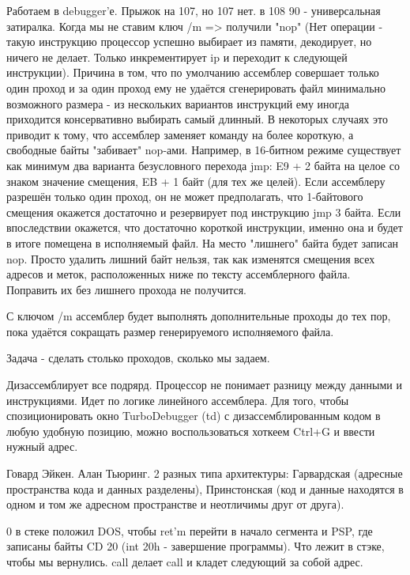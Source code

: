 Работаем в debugger'е.
Прыжок на 107, но 107 нет. в 108
90 - универсальная затиралка. Когда мы не ставим ключ /m => получили "nop" (Нет операции - такую инструкцию процессор успешно выбирает из памяти, декодирует, но ничего не делает. Только инкрементирует ip и переходит к следующей инструкции). Причина в том, что по умолчанию ассемблер совершает только один проход и за один проход ему не удаётся сгенерировать файл минимально возможного размера - из нескольких вариантов инструкций ему иногда приходится консервативно выбирать самый длинный. В некоторых случаях это приводит к тому, что ассемблер заменяет команду на более короткую, а свободные байты "забивает" nop-ами. Например, в 16-битном режиме существует как минимум два варианта безусловного перехода jmp: E9 + 2 байта на целое со знаком значение смещения, EB + 1 байт (для тех же целей). Если ассемблеру разрешён только один проход, он не может предполагать, что 1-байтового смещения окажется достаточно и резервирует под инструкцию jmp 3 байта. Если впоследствии окажется, что достаточно короткой инструкции, именно она и будет в итоге помещена в исполняемый файл. На место "лишнего" байта будет записан nop. Просто удалить лишний байт нельзя, так как изменятся смещения всех адресов и меток, расположенных ниже по тексту ассемблерного файла. Поправить их без лишнего прохода не получится.

С ключом /m ассемблер будет выполнять дополнительные проходы до тех пор, пока удаётся сокращать размер генерируемого исполняемого файла.
\begin{hw} Задача - сделать столько проходов, сколько мы задаем.\end{hw}

Дизассемблирует все подрярд. Процессор не понимает разницу между данными и инструкциями. Идет по логике линейного ассемблера. Для того, чтобы спозиционировать окно TurboDebugger (td) с дизассемблированным кодом в любую удобную позицию, можно воспользоваться хоткеем Ctrl+G и ввести нужный адрес.


\begin{rem}Говард Эйкен. Алан Тьюринг. 2 разных типа архитектуры: Гарвардская (адресные пространства кода и данных разделены), Принстонская (код и данные находятся в одном и том же адресном пространстве и неотличимы друг от друга). \end{rem}

0 в стеке положил DOS, чтобы ret'm перейти в начало сегмента и PSP, где записаны байты CD 20 (int 20h - завершение программы). Что лежит в стэке, чтобы мы вернулись. call делает call и кладет следующий за собой адрес.	

